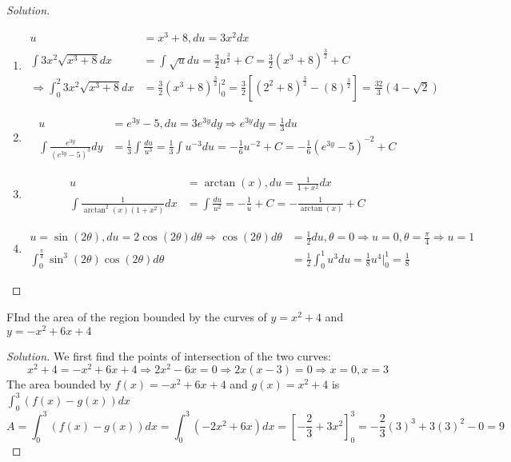 \documentclass[crop=false,class=book,oneside]{standalone}
\begin{document}
\begin{proof}[Solution]
\
\begin{enumerate}
    \item   \begin{align*}
    u&=x^{3}+8, du=3x^{2}dx\\
    \int 3x^{2}\sqrt{x^{3}+8}dx&=\int\sqrt{u}du=\frac{3}{2}u^{\frac{3}{2}}+C=\frac{3}{2}(x^{3}+8)^{\frac{3}{2}}+C\\
    \Rightarrow\int_{0}^{2}3x^{2}\sqrt{x^{3}+8}dx&=\frac{3}{2}(x^{3}+8)^{\frac{3}{2}}\big|_{0}^{2}=\frac{3}{2}[(2^{2}+8)^{\frac{3}{2}}-(8)^{\frac{3}{2}}]=\frac{32}{3}(4-\sqrt{2})
            \end{align*}
    \item   \begin{align*}
    u&=e^{3y}-5,du=3e^{3y}dy\Rightarrow e^{3y}dy=\frac{1}{3}du\\
    \int\frac{e^{3y}}{(e^{3y}-5)^{3}}dy&=\frac{1}{3}\int\frac{du}{u^{3}}=\frac{1}{3}\int u^{-3}du=-\frac{1}{6}u^{-2}+C=-\frac{1}{6}(e^{3y}-5)^{-2}+C
            \end{align*}
    \item   \begin{align*}
    u&=\arctan(x),du=\frac{1}{1+x^{2}}dx\\
    \int\frac{1}{\arctan^{2}(x)(1+x^{2})}dx&=\int\frac{du}{u^{2}}=-\frac{1}{u}+C=-\frac{1}{\arctan(x)}+C
            \end{align*}
    \item   \begin{align*}
    u=\sin(2\theta),du=2\cos(2\theta)d\theta\Rightarrow\cos(2\theta)d\theta&=\frac{1}{2}du,\theta=0\Rightarrow u=0,\theta=\frac{\pi}{4}\Rightarrow u=1\\
    \int_{0}^{\frac{\pi}{4}}\sin^{3}(2\theta)\cos(2\theta)d\theta&=\frac{1}{2}\int_{0}^{1}u^{3}du=\frac{1}{8}u^{4}\big|_{0}^{1}=\frac{1}{8}
            \end{align*}
\end{enumerate}
\end{proof}
\begin{problem}
FInd the area of the region bounded by the curves of $y=x^{2}+4$ and $y=-x^{2}+6x+4$
\end{problem}
\begin{proof}[Solution]
We first find the points of intersection of the two curves:
\begin{equation*}
    x^{2}+4=-x^{2}+6x+4\Rightarrow2x^{2}-6x=0\Rightarrow 2x(x-3)=0\Rightarrow x=0,x=3
\end{equation*}
The area bounded by $f(x)=-x^{2}+6x+4$ and $g(x)=x^{2}+4$ is $\int_{0}^{3}(f(x)-g(x))dx$
\begin{equation*}
    A=\int_{0}^{3}(f(x)-g(x))dx=\int_{0}^{3}(-2x^{2}+6x)dx=[-\frac{2}{3}+3x^{2}]_{0}^{3}=-\frac{2}{3}(3)^{3}+3(3)^{2}-0=9
\end{equation*}
\end{proof}
\end{document}

